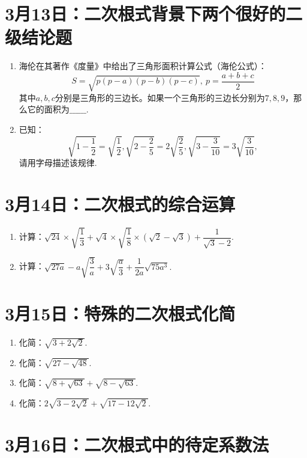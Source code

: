 \section*{3月13日：二次根式背景下两个很好的二级结论题}

\begin{enumerate}
    \item 海伦在其著作《度量》中给出了三角形面积计算公式（海伦公式）：$$S=\sqrt{p(p-a)(p-b)(p-c)}, ~p=\dfrac{a+b+c}{2}$$其中$a, b, c$分别是三角形的三边长。如果一个三角形的三边长分别为$7, 8, 9$，那么它的面积为$\_\_\_\_\_\_$. 
    \item 已知：$$\sqrt{1-\dfrac{1}{2}}=\sqrt{\dfrac{1}{2}}, \sqrt{2-\dfrac{2}{5}}=2\sqrt{\dfrac{2}{5}}, \sqrt{3-\dfrac{3}{10}}=3\sqrt{\dfrac{3}{10}},$$请用字母描述该规律. 
\end{enumerate}




\section*{3月14日：二次根式的综合运算}

\begin{enumerate}
    \item 计算：$\sqrt{24}\times\sqrt{\dfrac{1}{3}}+\sqrt{4}\times\sqrt{\dfrac{1}{8}}\times(\sqrt{2}-\sqrt{3})+\dfrac{1}{\sqrt{3}-2}.$
    \item 计算：$\sqrt{27a}-a\sqrt{\dfrac{3}{a}}+3\sqrt{\dfrac{a}{3}}+\dfrac{1}{2a}\sqrt{75a^3}.$
\end{enumerate}


\newpage


\section*{3月15日：特殊的二次根式化简}

\begin{enumerate}
    \item 化简：$\sqrt{3+2\sqrt{2}}.$
    \item 化简：$\sqrt{27-\sqrt{48}}.$
    \item 化简：$\sqrt{8+\sqrt{63}}+\sqrt{8-\sqrt{63}}.$
    \item 化简：$2\sqrt{3-2\sqrt{2}}+\sqrt{17-12\sqrt{2}}.$
\end{enumerate}




\section*{3月16日：二次根式中的待定系数法}

